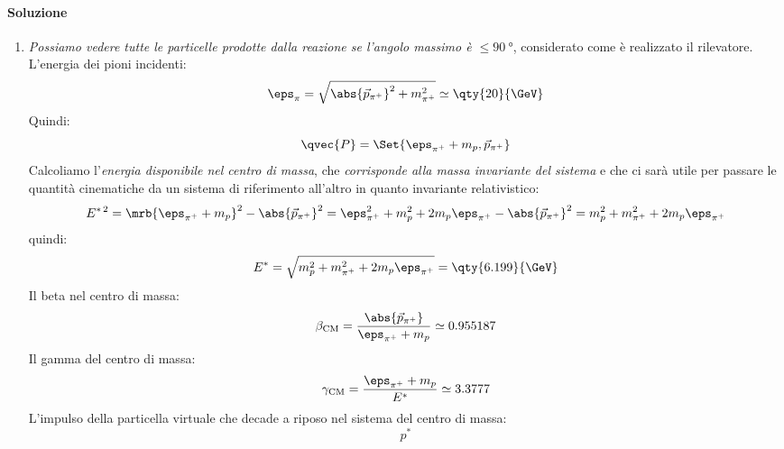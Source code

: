 \begin{example}
	\paragraph{Soluzione}
	\begin{enumerate}
		\item \textit{Possiamo vedere tutte le particelle prodotte dalla reazione
			      se l'angolo massimo è $\leq \qty{90}{\degree}$}, considerato come è
		      realizzato il rilevatore. L'energia dei pioni incidenti:
		      \begin{equation}
			      \eps _{\pi} = \sqrt{\abs{\vec{p}_{\pi^+}}^{2} + m _{\pi^+}^{2}}
			      \simeq \qty{20}{\GeV}
		      \end{equation}
		      Quindi:
		      \begin{equation}
			      \qvec{P} = \Set{\eps _{\pi^+} + m _{p}, \vec{p}_{\pi^+}}
		      \end{equation}
		      Calcoliamo l'\textit{energia disponibile nel centro di massa}, che
		      \textit{corrisponde alla massa invariante del sistema} e che ci sarà
		      utile per passare le quantità cinematiche da un sistema di
		      riferimento all'altro in quanto invariante relativistico:
		      \begin{equation}
			      E ^{\ast\,2}
			      = \mrb{\eps _{\pi^+} + m _{p}}^{2} - \abs{\vec{p} _{\pi^+}}^{2}
			      = \eps _{\pi^+}^{2} + m _{p}^{2} + 2 m_p \eps _{\pi^+} -
			      \abs{\vec{p} _{\pi^+}}^{2}
			      = m _{p}^{2} + m _{\pi^+}^{2} + 2 m_p \eps _{\pi^+}
		      \end{equation}
		      quindi:
		      \begin{equation}
			      E^\ast
			      = \sqrt{m _{p}^{2} + m _{\pi^+}^{2} + 2 m_p \eps _{\pi^+}}
			      = \qty{6.199}{\GeV}
		      \end{equation}
		      Il beta nel centro di massa:
		      \begin{equation}
			      \beta _{\text{CM}}
			      = \frac{\abs{\vec{p}_{\pi^+}}}{\eps _{\pi^+} + m _{p}}
			      \simeq 0.955187
		      \end{equation}
		      Il gamma del centro di massa:
		      \begin{equation}
			      \gamma _{\text{CM}}
			      = \frac{\eps _{\pi^+} + m _{p}}{E^\ast}
			      \simeq 3.3777
		      \end{equation}
		      L'impulso della particella virtuale che decade a riposo nel sistema
		      del centro di massa:
		      \begin{equation}
			      p^\ast

\end{equation}
\end{enumerate}
\end{example}
